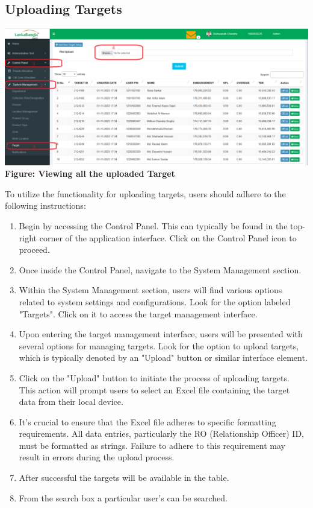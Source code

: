 \documentclass{article}
\begin{document}
\subsection{Uploading Targets}
\begin{center}
\includegraphics[width=1.0\textwidth]{image/settings_target_view.png}
\textbf{Figure: Viewing all the uploaded Target}
\end{center}

To utilize the functionality for uploading targets, users should adhere to the following instructions:

\begin{enumerate}
    \item Begin by accessing the Control Panel. This can typically be found in the top-right corner of the application interface. Click on the Control Panel icon to proceed.
    
    \item Once inside the Control Panel, navigate to the System Management section. 
    
    \item Within the System Management section, users will find various options related to system settings and configurations. Look for the option labeled "Targets". Click on it to access the target management interface.
    
    \item Upon entering the target management interface, users will be presented with several options for managing targets. Look for the option to upload targets, which is typically denoted by an "Upload" button or similar interface element.
    
    \item Click on the "Upload" button to initiate the process of uploading targets. This action will prompt users to select an Excel file containing the target data from their local device.
    
    \item It's crucial to ensure that the Excel file adheres to specific formatting requirements. All data entries, particularly the RO (Relationship Officer) ID, must be formatted as strings. Failure to adhere to this requirement may result in errors during the upload process.
    
    \item After successful the targets will be available in the table.
    
    \item From the search box a particular user's can be searched. 
     
\end{enumerate}
\end{document}
